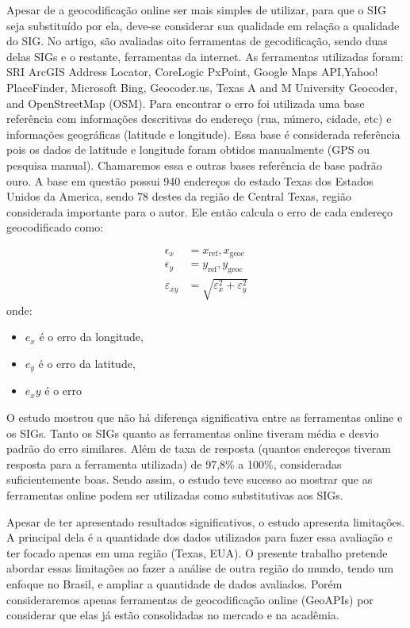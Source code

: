 Apesar de a geocodificação online ser mais simples de utilizar, para que o SIG seja substituído por ela, deve-se considerar sua qualidade em relação a qualidade do SIG. No artigo, \cite{Chow2016} são avaliadas oito ferramentas de gecodificação, sendo duas delas SIGs e o restante, ferramentas da internet. As ferramentas utilizadas foram: SRI ArcGIS Address Locator, CoreLogic PxPoint, Google Maps API,Yahoo!  PlaceFinder,  Microsoft  Bing,  Geocoder.us,  Texas  A and M  University  Geocoder,  and OpenStreetMap (OSM). Para encontrar o erro foi utilizada uma base referência com informações descritivas do endereço (rua, número, cidade, etc) e informações geográficas (latitude e longitude). Essa base é considerada referência pois os dados de latitude e longitude foram obtidos manualmente (GPS ou pesquisa manual). Chamaremos essa e outras bases referência de base padrão ouro. A base em questão possui 940 endereços do estado Texas dos Estados Unidos da America, sendo 78 destes da região de Central Texas, região considerada importante para o autor. Ele então calcula o erro de cada endereço geocodificado como:

\begin{align}
   \epsilon_x &= x_{\text{ref}}, x_{\text{geoc}} \\
   \epsilon_y &= y_{\text{ref}}, y_{\text{geoc}} \\
   \varepsilon_{xy} &= \sqrt{\varepsilon_x^2 + \varepsilon_y^2}
\end{align}
   onde:
   \begin{itemize}
     \item $e_x$ é o erro da longitude,
     \item $e_y$ é o erro da latitude,
     \item $e_xy$ é o erro
   \end{itemize}
   
O estudo mostrou que não há diferença significativa entre as ferramentas online e os SIGs. Tanto os SIGs quanto as ferramentas online tiveram média e desvio padrão do erro similares. Além de taxa de resposta (quantos endereços tiveram resposta para a ferramenta utilizada) de 97,8\% a 100\%, consideradas suficientemente boas. Sendo assim, o estudo teve sucesso ao mostrar que as ferramentas online podem ser utilizadas como substitutivas aos SIGs.
   
Apesar de \cite{Chow2016} ter apresentado resultados significativos, o estudo apresenta limitações. A principal dela é a quantidade dos dados utilizados para fazer essa avaliação e ter focado apenas em uma região (Texas, EUA). O presente trabalho pretende abordar essas limitações ao fazer a análise de outra região do mundo, tendo um enfoque no Brasil, e ampliar a quantidade de dados avaliados. Porém consideraremos apenas ferramentas de geocodificação online (GeoAPIs) por considerar que elas já estão consolidadas no mercado e na acadêmia.  

